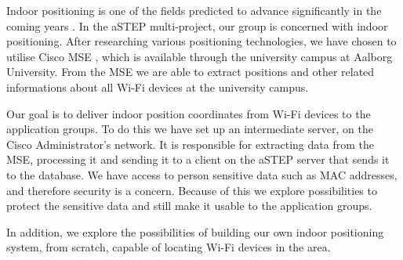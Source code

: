 Indoor positioning is one of the fields predicted to advance significantly in the coming years \cite{DonDIndoorIsNext}. In the aSTEP multi-project, our group is concerned with indoor positioning. After researching various positioning technologies, we have chosen to utilise Cisco MSE \cite{ciscoMSE}, which is available through the university campus at Aalborg University. From the MSE we are able to extract positions and other related informations about all Wi-Fi devices at the university campus.

Our goal is to deliver indoor position coordinates from Wi-Fi devices to the application groups. To do this we have set up an intermediate server, on the Cisco Administrator's network. It is responsible for extracting data from the MSE, processing it and sending it to a client on the aSTEP server that sends it to the database. We have access to person sensitive data such as MAC addresses, and therefore security is a concern. Because of this we explore possibilities to protect the sensitive data and still make it usable to the application groups.

In addition, we explore the possibilities of building our own indoor positioning system, from scratch, capable of locating Wi-Fi devices in the area.